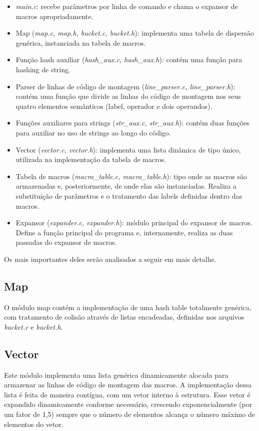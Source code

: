 \documentclass[12pt,a4paper]{article}
\numberwithin{equation}{section}
\begin{document}
\begin{itemize}
    \item \emph{main.c}: recebe parâmetros por linha de comando e chama o expansor de macros apropriadamente.
    \item Map (\emph{map.c, map.h, bucket.c, bucket.h}): implementa uma tabela de dispersão genérica, instanciada na tabela de macros.
    \item Função hash auxiliar (\emph{hash\_aux.c, hash\_aux.h}): contém uma função para hashing de string.
    \item Parser de linhas de código de montagem (\emph{line\_parser.c, line\_parser.h}): contém uma função que divide as linhas do código de montagem nos seus quatro elementos semânticos (label, operador e dois operandos).
    \item Funções auxiliares para strings (\emph{str\_aux.c, str\_aux.h}): contém duas funções para auxiliar no uso de strings ao longo do código.
    \item Vector (\emph{vector.c, vector.h}): implementa uma lista dinâmica de tipo único, utilizada na implementação da tabela de macros.
    \item Tabela de macros (\emph{macro\_table.c, macro\_table.h}): tipo onde as macros são armazenadas e, posteriormente, de onde elas são instanciadas. Realiza a substituição de parâmetros e o tratamento das labels definidas dentro das macros.
    \item Expansor (\emph{expander.c, expander.h}): módulo principal do expansor de macros. Define a função principal do programa e, internamente, realiza as duas passadas do expansor de macros.
\end{itemize}

Os mais importantes deles serão analisados a seguir em mais detalhe.

\subsection{Map}

O módulo map contém a implementação de uma hash table totalmente genérica, com tratamento de colisão através de listas encadeadas, definidas nos arquivos \emph{bucket.c} e \emph{bucket.h}.

\subsection{Vector}

Este módulo implementa uma lista genérica dinamicamente alocada para armazenar as linhas de código de montagem das macros. A implementação dessa lista é feita de maneira contígua, com um vetor interno à estrutura. Esse vetor é expandido dinamicamente conforme necessário, crescendo exponencialmente (por um fator de 1,5) sempre que o número de elementos alcança o número máximo de elementos do vetor.
\end{document}
